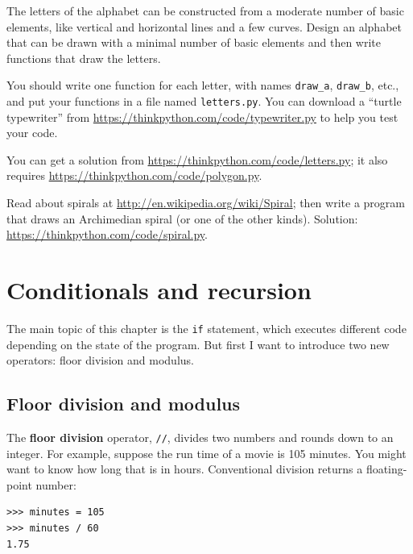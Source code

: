 \documentclass[10pt]{book}
\begin{document}
\begin{exercise}

The letters of the alphabet can be constructed from a moderate number
of basic elements, like vertical and horizontal lines and a few
curves.  Design an alphabet that can be drawn with a minimal
number of basic elements and then write functions that draw the letters.

You should write one function for each letter, with names
\verb"draw_a", \verb"draw_b", etc., and put your functions
in a file named {\tt letters.py}.  You can download a
``turtle typewriter'' from \url{https://thinkpython.com/code/typewriter.py}
to help you test your code.

You can get a solution from \url{https://thinkpython.com/code/letters.py};
it also requires
\url{https://thinkpython.com/code/polygon.py}.

\end{exercise}

\begin{exercise}

Read about spirals at \url{http://en.wikipedia.org/wiki/Spiral}; then
write a program that draws an Archimedian spiral (or one of the other
kinds).  Solution: \url{https://thinkpython.com/code/spiral.py}.

\end{exercise}


\chapter{Conditionals and recursion}

The main topic of this chapter is the {\tt if} statement, which
executes different code depending on the state of the program.
But first I want to introduce two new operators: floor division
and modulus.


\section{Floor division and modulus}

The {\bf floor division} operator, \verb"//", divides
two numbers and rounds down to an integer.  For example, suppose the
run time of a movie is 105 minutes.  You might want to know how
long that is in hours.  Conventional division
returns a floating-point number:

\begin{verbatim}
>>> minutes = 105
>>> minutes / 60
1.75
\end{verbatim}
\end{document}
